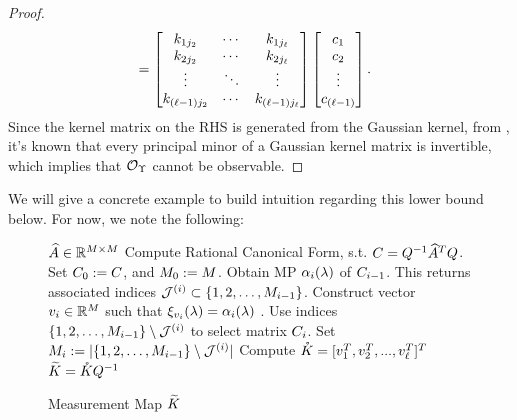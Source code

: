 \begin{proof}
\begin{align*}
	&=
	\begin{bmatrix}
	k_{1j_2} & \cdots & k_{1j_{\ell}}\\
	k_{2j_2} & \cdots & k_{2j_{\ell}}\\
	\vdots & \ddots & \vdots\\
	k_{(\ell-1)j_2} & \cdots & k_{(\ell-1)j_{\ell}}\\
	\end{bmatrix} 
	\begin{bmatrix}
	c_1\\
	c_2\\
	\vdots\\   
	c_{(\ell-1)}
	\end{bmatrix}. 
	\end{align*}
	Since the kernel matrix on the RHS is generated from the Gaussian kernel, from \cite{micchelli1984interpolation}, 
	it's known that every principal minor of a Gaussian kernel matrix is invertible, which implies that $\mathcal{O}_{\Upsilon}$ cannot be observable. 
\end{proof}


We will give a concrete example to build intuition regarding this lower bound below. For now, we note the following:
\begin{figure}[t!]
	\begin{algorithm}[H]
		\caption{Measurement Map $\widetilde{K}$}
		\label{alg:measmap}
		\begin{algorithmic}
				 $\widehat{A}\in\mathbb{R}^{M\times M}$
				\STATE Compute Rational Canonical Form, s.t. $C = Q^{-1}\widehat{A}^TQ$. Set $C_0:=C$, and
				$M_0:=M$. 
				\STATE Obtain MP $\alpha_i(\lambda)$ of $C_{i-1}$. 
				This returns associated indices $\mathcal{J}^{({i})}\subset\{1,2,\dots,M_{i-1}\}$. 
				\STATE Construct vector $v_i \in \mathbb{R}^{M}$ such that 
				$\xi_{v_i}(\lambda)=\alpha_{i}(\lambda)$ .
				\STATE Use indices $\{1,2,\dots,M_{i-1}\}\setminus\mathcal{J}^{({i})}$ to select matrix $C_i$. Set 
				$M_i:= |\{1,2,\dots,M_{i-1}\}\setminus\mathcal{J}^{({i})}|$
				\ENDFOR
				\STATE Compute $ \mathring{K} = [v_1^T, v_2^T,...,v_{\ell}^T]^T$
				 $\widetilde{K} =\mathring{K}Q^{-1}$
		\end{algorithmic}
	\end{algorithm}
\end{figure}


